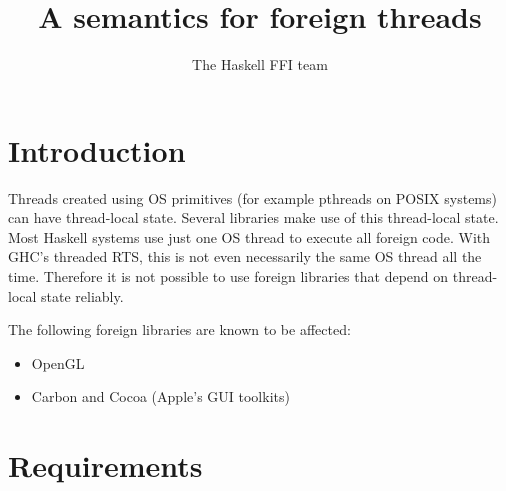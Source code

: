 \documentclass{article}
\begin{document}
\title{A semantics for foreign threads}

\author{The Haskell FFI team}
\maketitle

\makeatactive

\section{Introduction}

Threads created using OS primitives (for example pthreads on POSIX systems) can
have thread-local state. Several libraries make use of this thread-local state.
Most Haskell systems use just one OS thread to execute all foreign code.
With GHC's threaded RTS, this is not even necessarily the same OS thread all the
time.
Therefore it is not possible to use foreign libraries that depend on thread-local
state reliably.

The following foreign libraries are known to be affected:
\begin{itemize}
\item OpenGL
\item Carbon and Cocoa (Apple's GUI toolkits)
\end{itemize}

\section{Requirements}
\end{document}
